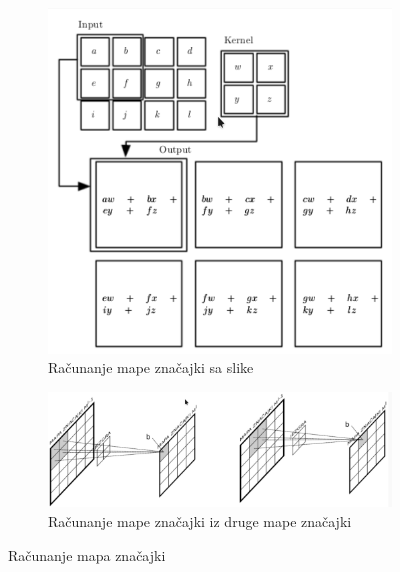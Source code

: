 \begin{figure}[htb]
	\centering
	\begin{subfigure}[b]{0.8\linewidth}
		\includegraphics[width=\linewidth]{img/ConvExample.png}
		\caption{Računanje mape značajki sa slike}
		\label{img:feature_map1}
	\end{subfigure}
	\begin{subfigure}[b]{0.8\linewidth}
		\includegraphics[width=\linewidth]{img/ConvExample2.png}
		\caption{Računanje mape značajki iz druge mape značajki}
		\label{img:feature_map2}
	\end{subfigure}
	\caption{Računanje mapa značajki}
	\label{img:feature_map}
\end{figure}

